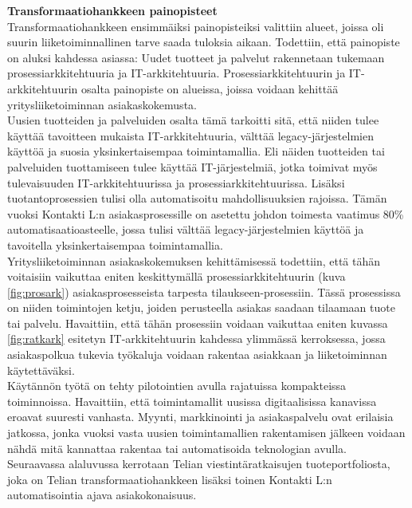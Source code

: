 \documentclass[finnish,12pt,a4paper,pdftex]{article}
\begin{document}
\textbf{Transformaatiohankkeen painopisteet}\\

Transformaatiohankkeen ensimmäiksi painopisteiksi valittiin alueet, joissa oli suurin liiketoiminnallinen tarve saada tuloksia aikaan. Todettiin, että painopiste on aluksi kahdessa asiassa: Uudet tuotteet ja palvelut rakennetaan tukemaan prosessiarkkitehtuuria ja IT-arkkitehtuuria. Prosessiarkkitehtuurin ja IT-arkkitehtuurin osalta painopiste on alueissa, joissa voidaan kehittää yritysliiketoiminnan asiakaskokemusta.\\

\noindent Uusien tuotteiden ja palveluiden osalta tämä tarkoitti sitä, että niiden tulee käyttää tavoitteen mukaista IT-arkkitehtuuria, välttää legacy-järjestelmien käyttöä ja suosia yksinkertaisempaa toimintamallia. Eli näiden tuotteiden tai palveluiden tuottamiseen tulee käyttää IT-järjestelmiä, jotka toimivat myös tulevaisuuden IT-arkkitehtuurissa ja prosessiarkkitehtuurissa. Lisäksi tuotantoprosessien tulisi olla automatisoitu mahdollisuuksien rajoissa. Tämän vuoksi Kontakti L:n asiakasprosessille on asetettu johdon toimesta vaatimus 80\% automatisaatioasteelle, jossa tulisi välttää legacy-järjestelmien käyttöä ja tavoitella yksinkertaisempaa toimintamallia. \\

\noindent Yritysliiketoiminnan asiakaskokemuksen kehittämisessä todettiin, että tähän voitaisiin vaikuttaa eniten keskittymällä prosessiarkkitehtuurin (kuva \ref{fig:prosark}) asiakasprosesseista tarpesta tilaukseen-prosessiin. Tässä prosessissa on niiden toimintojen ketju, joiden perusteella asiakas saadaan tilaamaan tuote tai palvelu. Havaittiin, että tähän prosessiin voidaan vaikuttaa eniten kuvassa \ref{fig:ratkark} esitetyn IT-arkkitehtuurin kahdessa ylimmässä kerroksessa, jossa asiakaspolkua tukevia työkaluja voidaan rakentaa asiakkaan ja liiketoiminnan käytettäväksi.\\

Käytännön työtä on tehty pilotointien avulla rajatuissa kompakteissa toiminnoissa. Havaittiin, että toimintamallit uusissa digitaalisissa kanavissa eroavat suuresti vanhasta. Myynti, markkinointi ja asiakaspalvelu ovat erilaisia jatkossa, jonka vuoksi vasta uusien toimintamallien rakentamisen jälkeen voidaan nähdä mitä kannattaa rakentaa tai automatisoida teknologian avulla.\\

\noindent Seuraavassa alaluvussa kerrotaan Telian viestintäratkaisujen tuoteportfoliosta, joka on Telian transformaatiohankkeen lisäksi toinen Kontakti L:n automatisointia ajava asiakokonaisuus.
\end{document}

